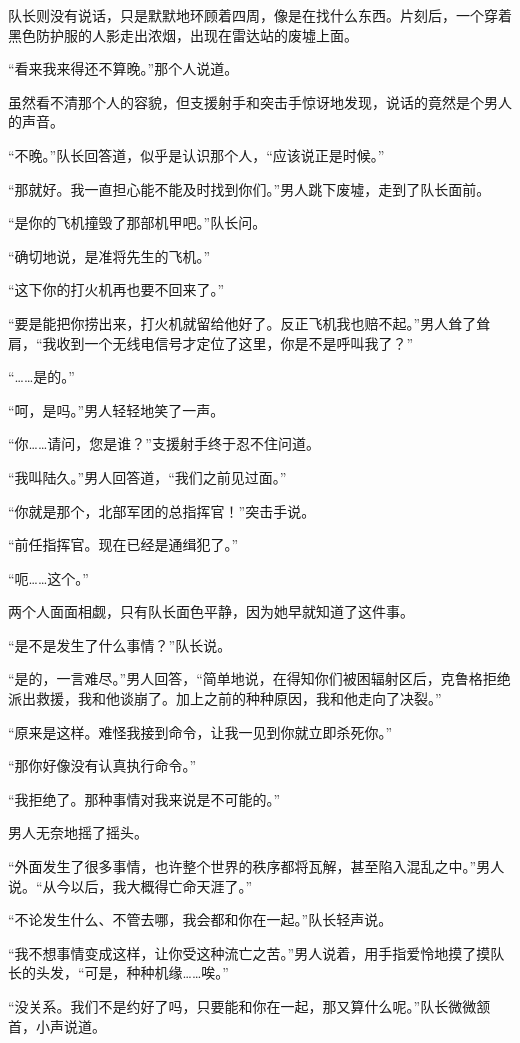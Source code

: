 队长则没有说话，只是默默地环顾着四周，像是在找什么东西。片刻后，一个穿着黑色防护服的人影走出浓烟，出现在雷达站的废墟上面。

“看来我来得还不算晚。”那个人说道。

虽然看不清那个人的容貌，但支援射手和突击手惊讶地发现，说话的竟然是个男人的声音。

“不晚。”队长回答道，似乎是认识那个人，“应该说正是时候。”

“那就好。我一直担心能不能及时找到你们。”男人跳下废墟，走到了队长面前。

“是你的飞机撞毁了那部机甲吧。”队长问。

“确切地说，是准将先生的飞机。”

“这下你的打火机再也要不回来了。”

“要是能把你捞出来，打火机就留给他好了。反正飞机我也赔不起。”男人耸了耸肩，“我收到一个无线电信号才定位了这里，你是不是呼叫我了？”

“……是的。”

“呵，是吗。”男人轻轻地笑了一声。

“你……请问，您是谁？”支援射手终于忍不住问道。

“我叫陆久。”男人回答道，“我们之前见过面。”

“你就是那个，北部军团的总指挥官！”突击手说。

“前任指挥官。现在已经是通缉犯了。”

“呃……这个。”

两个人面面相觑，只有队长面色平静，因为她早就知道了这件事。

“是不是发生了什么事情？”队长说。

“是的，一言难尽。”男人回答，“简单地说，在得知你们被困辐射区后，克鲁格拒绝派出救援，我和他谈崩了。加上之前的种种原因，我和他走向了决裂。”

“原来是这样。难怪我接到命令，让我一见到你就立即杀死你。”

“那你好像没有认真执行命令。”

“我拒绝了。那种事情对我来说是不可能的。”

男人无奈地摇了摇头。

“外面发生了很多事情，也许整个世界的秩序都将瓦解，甚至陷入混乱之中。”男人说。“从今以后，我大概得亡命天涯了。”

“不论发生什么、不管去哪，我会都和你在一起。”队长轻声说。

“我不想事情变成这样，让你受这种流亡之苦。”男人说着，用手指爱怜地摸了摸队长的头发，“可是，种种机缘……唉。”

“没关系。我们不是约好了吗，只要能和你在一起，那又算什么呢。”队长微微颔首，小声说道。

